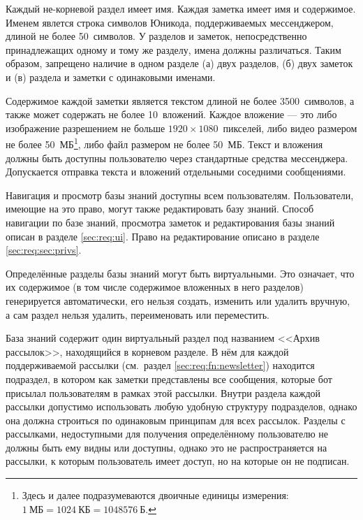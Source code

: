     Каждый не-корневой раздел имеет имя. Каждая заметка имеет имя и содержимое.
    Именем явлется строка символов Юникода, поддерживаемых мессенджером, длиной
    не более 50~символов. У разделов и заметок, непосредственно принадлежащих одному и тому же
    разделу, имена должны различаться. Таким образом, запрещено наличие в одном разделе
    (а) двух разделов, (б) двух заметок и (в) раздела и заметки с одинаковыми именами.

    Содержимое каждой заметки является текстом длиной не более 3500~символов, а также может содержать
    не более 10~вложений. Каждое вложение --- это либо изображение разрешением не больше
    \(1920 \times 1080\)~пикселей, либо видео размером не более 50~МБ\footnote{
        Здесь и далее подразумеваются двоичные единицы измерения: \(1~\text{МБ} = 1024~\text{КБ}
        = 1048576~\text{Б}\).
    }, либо файл размером не более 50~МБ. Текст и вложения должны быть доступны пользователю
    через стандартные средства мессенджера. Допускается отправка текста и вложений
    отдельными соседними сообщениями.

    Навигация и просмотр базы знаний доступны всем пользователям.
    Пользователи, имеющие на это право, могут также редактировать базу знаний.
    Способ навигации по базе знаний, просмотра заметок и редактирования базы знаний
    описан в разделе \ref{sec:req:ui}.
    Право на редактирование описано в разделе
    \ref{sec:req:sec:privs}.

    Определённые разделы базы знаний могут быть виртуальными. Это означает, что их содержимое
    (в том числе содержимое вложенных в него разделов)
    генерируется автоматически, его нельзя создать, изменить или удалить вручную,
    а сам раздел нельзя удалить, переименовать или переместить.

    База знаний содержит один виртуальный раздел под названием <<Архив рассылок>>,
    находящийся в корневом разделе. В нём для каждой поддерживаемой рассылки
    (см.~раздел \ref{sec:req:fn:newsletter}) находится
    подраздел, в котором как заметки представлены все сообщения, которые бот присылал пользователям
    в рамках этой рассылки. Внутри раздела каждой рассылки допустимо использовать любую
    удобную структуру подразделов, однако она должна строиться по одинаковым принципам для всех рассылок.
    Разделы с рассылками, недоступными для получения определённому пользователю не должны быть ему
    видны или доступны, однако это не распространяется на рассылки, к которым пользователь имеет
    доступ, но на которые он не подписан.

